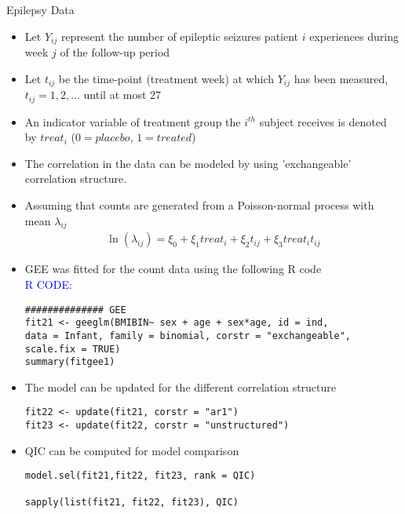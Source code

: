 \documentclass{beamer}
\begin{document}
\begin{frame}{Epilepsy Data}
\begin{itemize}
\item Let $Y_{ij}$ represent the number of epileptic seizures patient $i$ experiences during week $j$ of the follow-up period \vspace{0.25cm}
\item Let $t_{ij}$ be the time-point (treatment week) at which $Y_{ij}$ has been measured, $t_{ij}= 1, 2, \ldots$ until at most $27$ \vspace{0.25cm}
\item An indicator variable of treatment group the $i^{th}$ subject receives is denoted by $treat_i$ ($0=placebo$, $1=treated$) \vspace{0.25cm}
\item The correlation in the data can be modeled by using 'exchangeable' correlation structure.
\item Assuming that counts are generated from a Poisson-normal process with mean $\lambda_{ij}$
\begin{eqnarray}
\ln(\lambda_{ij}) = \xi_0 +\xi_1 treat_i + \xi_2 t_{ij}+ \xi_3 treat_i t_{ij}\nonumber
\end{eqnarray}
\end{itemize}
\end{frame}

\begin{frame}[fragile]
\begin{itemize}
	\item GEE was fitted for the count data using the following R code\\
\textcolor{blue}{R CODE:}\scriptsize \begin{verbatim}
############## GEE
fit21 <- geeglm(BMIBIN~ sex + age + sex*age, id = ind, 
data = Infant, family = binomial, corstr = "exchangeable", scale.fix = TRUE)
summary(fitgee1)
\end{verbatim}
\item The model can be updated for the different correlation structure
\begin{verbatim}
fit22 <- update(fit21, corstr = "ar1")
fit23 <- update(fit22, corstr = "unstructured")
\end{verbatim}
\item QIC can be computed for model comparison
\begin{verbatim}
model.sel(fit21,fit22, fit23, rank = QIC)

sapply(list(fit21, fit22, fit23), QIC)
\end{verbatim}
\end{itemize}
\end{frame}
\end{document}

